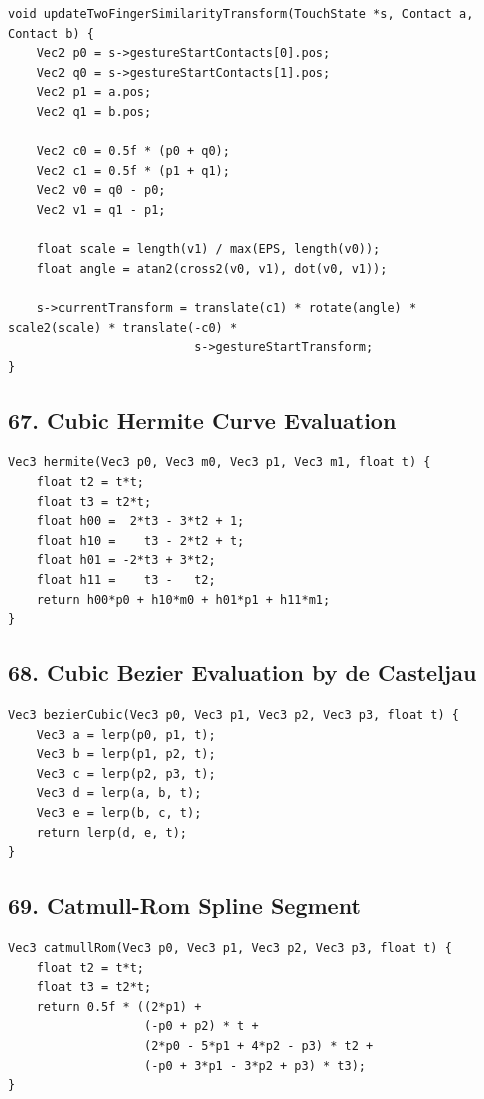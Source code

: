 \documentclass[10pt,letterpaper]{article}
\begin{document}
\begin{verbatim}
void updateTwoFingerSimilarityTransform(TouchState *s, Contact a, Contact b) {
    Vec2 p0 = s->gestureStartContacts[0].pos;
    Vec2 q0 = s->gestureStartContacts[1].pos;
    Vec2 p1 = a.pos;
    Vec2 q1 = b.pos;

    Vec2 c0 = 0.5f * (p0 + q0);
    Vec2 c1 = 0.5f * (p1 + q1);
    Vec2 v0 = q0 - p0;
    Vec2 v1 = q1 - p1;

    float scale = length(v1) / max(EPS, length(v0));
    float angle = atan2(cross2(v0, v1), dot(v0, v1));

    s->currentTransform = translate(c1) * rotate(angle) * scale2(scale) * translate(-c0) *
                          s->gestureStartTransform;
}
\end{verbatim}

\subsection{67. Cubic Hermite Curve Evaluation}

\begin{verbatim}
Vec3 hermite(Vec3 p0, Vec3 m0, Vec3 p1, Vec3 m1, float t) {
    float t2 = t*t;
    float t3 = t2*t;
    float h00 =  2*t3 - 3*t2 + 1;
    float h10 =    t3 - 2*t2 + t;
    float h01 = -2*t3 + 3*t2;
    float h11 =    t3 -   t2;
    return h00*p0 + h10*m0 + h01*p1 + h11*m1;
}
\end{verbatim}

\subsection{68. Cubic Bezier Evaluation by de Casteljau}

\begin{verbatim}
Vec3 bezierCubic(Vec3 p0, Vec3 p1, Vec3 p2, Vec3 p3, float t) {
    Vec3 a = lerp(p0, p1, t);
    Vec3 b = lerp(p1, p2, t);
    Vec3 c = lerp(p2, p3, t);
    Vec3 d = lerp(a, b, t);
    Vec3 e = lerp(b, c, t);
    return lerp(d, e, t);
}
\end{verbatim}

\subsection{69. Catmull-Rom Spline Segment}

\begin{verbatim}
Vec3 catmullRom(Vec3 p0, Vec3 p1, Vec3 p2, Vec3 p3, float t) {
    float t2 = t*t;
    float t3 = t2*t;
    return 0.5f * ((2*p1) +
                   (-p0 + p2) * t +
                   (2*p0 - 5*p1 + 4*p2 - p3) * t2 +
                   (-p0 + 3*p1 - 3*p2 + p3) * t3);
}
\end{verbatim}
\end{document}
